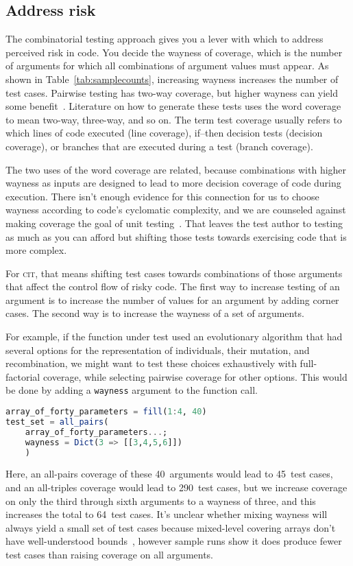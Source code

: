 \documentclass{juliacon}
\newcommand{\cit}{\textsc{cit}\xspace}
\begin{document}
\subsection{Address risk}

The combinatorial testing approach gives you a lever with which to address perceived risk in code. You decide the wayness of coverage, which is the number of arguments for which all combinations of argument values must appear. As shown in Table~\ref{tab:samplecounts}, increasing wayness increases the number of test cases. Pairwise testing has two-way coverage, but higher wayness can yield some benefit~\cite{Petke2015-ex}. Literature on how to generate these tests uses the word coverage to mean two-way, three-way, and so on. The term test coverage usually refers to which lines of code executed (line coverage), if--then decision tests (decision coverage), or branches that are executed during a test (branch coverage).

\vskip 6pt
The two uses of the word coverage are related, because combinations with higher wayness as inputs are designed to lead to more decision coverage of code during execution. There isn't enough evidence for this connection for us to choose wayness according to code's cyclomatic complexity, and we are counseled against making coverage the goal of unit testing~\cite{Inozemtseva2014-gz}. That leaves the test author to testing as much as you can afford but shifting those tests towards exercising code that is more complex.

\vskip 6pt
For \cit, that means shifting test cases towards combinations of those arguments that affect the control flow of risky code. The first way to increase testing of an argument is to increase the number of values for an argument by adding corner cases. The second way is to increase the wayness of a set of arguments.

\vskip 6pt
For example, if the function under test used an evolutionary algorithm that had several options for the representation of individuals, their mutation, and recombination, we might want to test these choices exhaustively with full-factorial coverage, while selecting pairwise coverage for other options. This would be done by adding a \verb|wayness| argument to the function call.
\begin{lstlisting}[language=Julia]
array_of_forty_parameters = fill(1:4, 40)
test_set = all_pairs(
    array_of_forty_parameters...;
    wayness = Dict(3 => [[3,4,5,6]])
    )
\end{lstlisting}
Here, an all-pairs coverage of these 40~arguments would lead to 45~test cases, and an all-triples coverage would lead to 290~test cases, but we increase coverage on only the third through sixth arguments to a wayness of three, and this increases the total to 64~test cases. It's unclear whether mixing wayness will always yield a small set of test cases because mixed-level covering arrays don't have well-understood bounds~\cite{Cohen2003-pg}, however sample runs show it does produce fewer test cases than raising coverage on all arguments.
\end{document}
